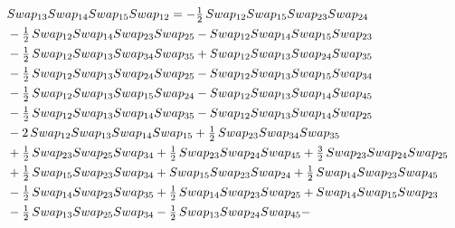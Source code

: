 \documentclass[10pt,a4paper]{amsart}
\begin{document}
\begin{align*}
        \\
        &\textnormal{Swap}_{13}   \textnormal{Swap}_{14}   \textnormal{Swap}_{15}   \textnormal{Swap}_{12} = -\tfrac12\,\textnormal{Swap}_{12} \textnormal{Swap}_{15} \textnormal{Swap}_{23} \textnormal{Swap}_{24}\\ & - \tfrac12\,\textnormal{Swap}_{12} \textnormal{Swap}_{14} \textnormal{Swap}_{23} \textnormal{Swap}_{25} - \textnormal{Swap}_{12} \textnormal{Swap}_{14} \textnormal{Swap}_{15} \textnormal{Swap}_{23}\\ & -
        \tfrac12\,\textnormal{Swap}_{12} \textnormal{Swap}_{13} \textnormal{Swap}_{34} \textnormal{Swap}_{35} + \textnormal{Swap}_{12} \textnormal{Swap}_{13} \textnormal{Swap}_{24} \textnormal{Swap}_{35}\\ & - \tfrac12\,\textnormal{Swap}_{12} \textnormal{Swap}_{13} \textnormal{Swap}_{24} \textnormal{Swap}_{25} -
        \textnormal{Swap}_{12} \textnormal{Swap}_{13} \textnormal{Swap}_{15} \textnormal{Swap}_{34}\\ & - \tfrac12\,\textnormal{Swap}_{12} \textnormal{Swap}_{13} \textnormal{Swap}_{15} \textnormal{Swap}_{24} - \textnormal{Swap}_{12} \textnormal{Swap}_{13} \textnormal{Swap}_{14} \textnormal{Swap}_{45}\\ & -
        \tfrac12\,\textnormal{Swap}_{12} \textnormal{Swap}_{13} \textnormal{Swap}_{14} \textnormal{Swap}_{35} - \textnormal{Swap}_{12} \textnormal{Swap}_{13} \textnormal{Swap}_{14} \textnormal{Swap}_{25}\\ & - 2\,\textnormal{Swap}_{12} \textnormal{Swap}_{13} \textnormal{Swap}_{14} \textnormal{Swap}_{15} +
        \tfrac12\,\textnormal{Swap}_{23} \textnormal{Swap}_{34} \textnormal{Swap}_{35}\\ & + \tfrac12\,\textnormal{Swap}_{23} \textnormal{Swap}_{25} \textnormal{Swap}_{34} + \tfrac12\,\textnormal{Swap}_{23} \textnormal{Swap}_{24} \textnormal{Swap}_{45} + \tfrac32\,\textnormal{Swap}_{23} \textnormal{Swap}_{24} \textnormal{Swap}_{25}\\& +
        \tfrac12\,\textnormal{Swap}_{15} \textnormal{Swap}_{23} \textnormal{Swap}_{34} + \textnormal{Swap}_{15} \textnormal{Swap}_{23} \textnormal{Swap}_{24} + \tfrac12\,\textnormal{Swap}_{14} \textnormal{Swap}_{23} \textnormal{Swap}_{45}\\ & - \tfrac12\,\textnormal{Swap}_{14} \textnormal{Swap}_{23} \textnormal{Swap}_{35} +
        \tfrac12\,\textnormal{Swap}_{14} \textnormal{Swap}_{23} \textnormal{Swap}_{25} + \textnormal{Swap}_{14} \textnormal{Swap}_{15} \textnormal{Swap}_{23} \\ & - \tfrac12\,\textnormal{Swap}_{13} \textnormal{Swap}_{25} \textnormal{Swap}_{34} - \tfrac12\,\textnormal{Swap}_{13} \textnormal{Swap}_{24} \textnormal{Swap}_{45} -

\end{align*}
\end{document}
